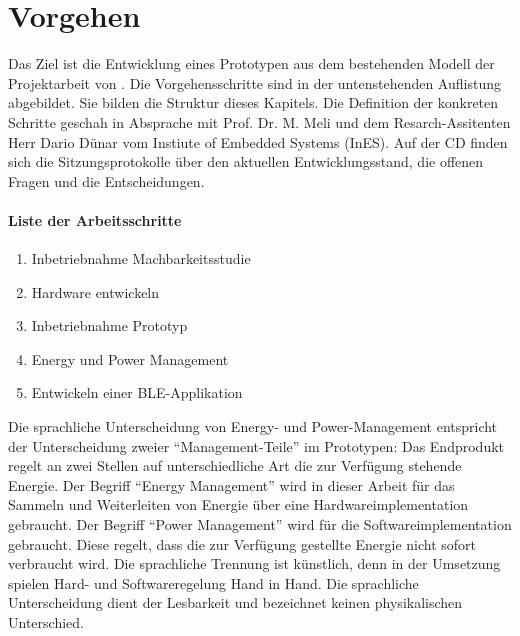 \chapter{Vorgehen}
\label{ch_vorgehen} 

Das Ziel ist die Entwicklung eines Prototypen aus dem bestehenden Modell der Projektarbeit von \cite{PA_bicycle}. Die Vorgehensschritte sind in der untenstehenden Auflistung abgebildet. Sie bilden die Struktur dieses Kapitels. Die Definition der konkreten Schritte geschah in Absprache mit Prof. Dr. M. Meli und dem Resarch-Assitenten Herr Dario Dünar vom Instiute of Embedded Systems (InES). Auf der CD finden sich die Sitzungsprotokolle über den aktuellen Entwicklungsstand, die offenen Fragen und die Entscheidungen.

\subsubsection*{Liste der Arbeitsschritte}
\label{liste} 

\begin{enumerate}
  \item Inbetriebnahme Machbarkeitsstudie  
  \item Hardware entwickeln  
  \item Inbetriebnahme Prototyp      
  \item Energy und Power Management
  \item Entwickeln einer BLE-Applikation       
 \end{enumerate}  

Die sprachliche Unterscheidung von Energy- und Power-Management entspricht der Unterscheidung zweier ``Management-Teile'' im Prototypen: Das Endprodukt regelt an zwei Stellen auf unterschiedliche Art die zur Verfügung stehende Energie. Der Begriff ``Energy Management'' wird in dieser Arbeit für das Sammeln und Weiterleiten von Energie über eine Hardwareimplementation gebraucht. Der Begriff ``Power Management'' wird für die Softwareimplementation gebraucht. Diese regelt, dass die zur Verfügung gestellte Energie nicht sofort verbraucht wird. Die sprachliche Trennung ist künstlich, denn in der Umsetzung spielen Hard- und Softwareregelung Hand in Hand. Die sprachliche Unterscheidung dient der Lesbarkeit und bezeichnet keinen physikalischen Unterschied.
 
 
  
